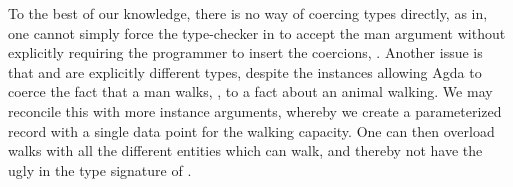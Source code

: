 To the best of our knowledge, there is no way of coercing types directly, as in,
one cannot simply force the type-checker in  to accept the man
argument  without explicitly requiring the programmer to insert the
coercions, . Another issue is that  and
 are explicitly different types, despite the instances allowing Agda
to coerce the fact that a man walks, , to a fact about an
animal walking. We may reconcile this with more instance arguments, whereby we
create a parameterized record  with a single data point for the
walking capacity. One can then overload walks with all the different entities
which can walk, and thereby not have the ugly  in the type
signature of .

\begin{code}%
\>[0]\AgdaSpace{}%
\AgdaSpace{}%
\AgdaSymbol{\{}\AgdaSymbol{\}}\AgdaSpace{}%
\AgdaSymbol{(}\AgdaSpace{}%
\AgdaSymbol{:}\AgdaSpace{}%
\AgdaSpace{}%
\AgdaSymbol{)}\AgdaSpace{}%
\AgdaSymbol{:}\AgdaSpace{}%
\AgdaSpace{}%
\AgdaSpace{}%
\<%
\\
\>[0][@{}l@{\AgdaIndent{0}}]%
\>[2]\<%
\\
\>[2][@{}l@{\AgdaIndent{0}}]%
\>[4]\AgdaSpace{}%
\AgdaSymbol{:}\AgdaSpace{}%
\AgdaSpace{}%
\AgdaSpace{}%
\<%
\\
%
\\[\AgdaEmptyExtraSkip]%
\>[0]\AgdaSpace{}%
\AgdaSpace{}%
\AgdaSpace{}%
\<%
\\
%
\\[\AgdaEmptyExtraSkip]%
\>[0]\<%
\\
\>[0][@{}l@{\AgdaIndent{0}}]%
\>[2]\AgdaSpace{}%
\AgdaSymbol{:}\AgdaSpace{}%
\AgdaSpace{}%
\<%
\\
%
\\[\AgdaEmptyExtraSkip]%
\>[0]\<%
\\
\>[0][@{}l@{\AgdaIndent{0}}]%
\>[2]\AgdaSpace{}%
\AgdaSymbol{:}\AgdaSpace{}%
\AgdaSpace{}%
\<%
\\
%
\>[2]\AgdaSpace{}%

\end{code}
